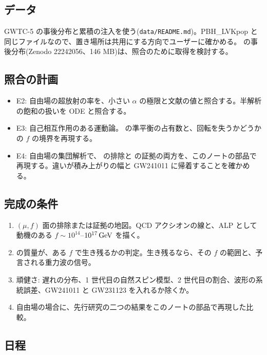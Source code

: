 \subsection{データ}

GWTC-5 の事後分布と累積の注入を使う(\texttt{data/README.md})。PBH\_LVKpop と同じファイルなので、置き場所は共用にする方向でユーザーに確かめる。 の事後分布(Zenodo 22242056、146 MB)は、照合のために取得を検討する。

\subsection{照合の計画}

\begin{itemize}
\item E2: 自由場の超放射の率を、小さい $\alpha$ の極限と文献の値と照合する。半解析の飽和の扱いを ODE と照合する。
\item E3: 自己相互作用のある運動論。 の準平衡の占有数と、回転を失うかどうかの $f$ の境界を再現する。
\item E4: 自由場の集団解析で、 の排除と  の証拠の両方を、このノートの部品で再現する。違いが積み上がりの幅と GW241011 に帰着することを確かめる。
\end{itemize}

\subsection{完成の条件}

\begin{enumerate}
\item $(\mu,f)$ 面の排除または証拠の地図。QCD アクシオンの線と、ALP として動機のある $f\sim10^{14}$--$10^{17}\,\mathrm{GeV}$ を描く。
\item {} の質量が、ある $f$ で生き残るかの判定。生き残るなら、その $f$ の範囲と、予言される重力波の信号。
\item 頑健さ: 遅れの分布、1 世代目の自然スピン模型、2 世代目の割合、波形の系統誤差、GW241011 と GW231123 を入れるか除くか。
\item 自由場の場合に、先行研究の二つの結果をこのノートの部品で再現した比較。
\end{enumerate}

\subsection{日程}

